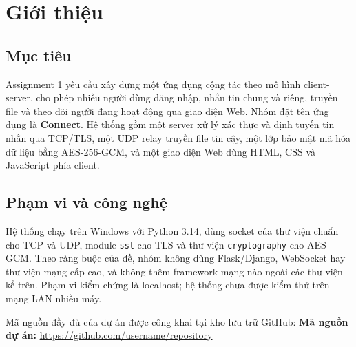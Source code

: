 \section{Giới thiệu}

\subsection{Mục tiêu}
Assignment 1 yêu cầu xây dựng một ứng dụng cộng tác theo mô hình client-server, cho phép nhiều người dùng đăng nhập, nhắn tin chung và riêng, truyền file và theo dõi người đang hoạt động qua giao diện Web. Nhóm đặt tên ứng dụng là \textbf{Connect}. Hệ thống gồm một server xử lý xác thực và định tuyến tin nhắn qua TCP/TLS, một UDP relay truyền file tin cậy, một lớp bảo mật mã hóa dữ liệu bằng AES-256-GCM, và một giao diện Web dùng HTML, CSS và JavaScript phía client.

\subsection{Phạm vi và công nghệ}
Hệ thống chạy trên Windows với Python 3.14, dùng socket của thư viện chuẩn cho TCP và UDP, module \texttt{ssl} cho TLS và thư viện \texttt{cryptography} cho AES-GCM. Theo ràng buộc của đề, nhóm không dùng Flask/Django, WebSocket hay thư viện mạng cấp cao, và không thêm framework mạng nào ngoài các thư viện kể trên. Phạm vi kiểm chứng là localhost; hệ thống chưa được kiểm thử trên mạng LAN nhiều máy.

Mã nguồn đầy đủ của dự án được công khai tại kho lưu trữ GitHub:
\noindent
\textbf{Mã nguồn dự án:}
\url{https://github.com/username/repository}